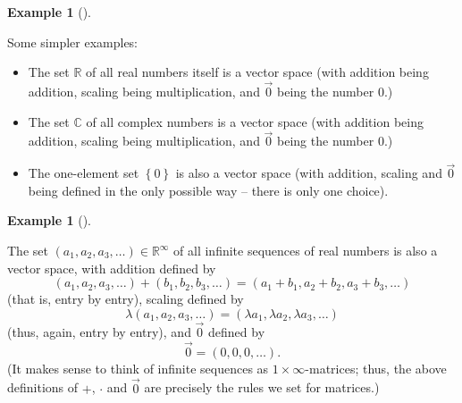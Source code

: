 \documentclass[numbers=enddot,12pt,final,onecolumn,notitlepage]{scrartcl}%
\theoremstyle{definition}
\newtheorem{exam}[theo]{Example}
\newenvironment{example}[1][]
{\begin{exam}[#1]\begin{leftbar}}
{\end{leftbar}\end{exam}}
\begin{document}
\begin{example}
\label{exam.vectspace.RC0}Some simpler examples:

\begin{itemize}
\item The set $\mathbb{R}$ of all real numbers itself is a vector space (with
addition being addition, scaling being multiplication, and $\overrightarrow{0}%
$ being the number $0$.)

\item The set $\mathbb{C}$ of all complex numbers is a vector space (with
addition being addition, scaling being multiplication, and $\overrightarrow{0}%
$ being the number $0$.)

\item The one-element set $\left\{  0\right\}  $ is also a vector space (with
addition, scaling and $\overrightarrow{0}$ being defined in the only possible
way -- there is only one choice).
\end{itemize}
\end{example}

\begin{example}
\label{exam.vectspace.Rinf}The set $\left(  a_{1},a_{2},a_{3},\ldots\right)
\in\mathbb{R}^{\infty}$ of all infinite sequences of real numbers is also a
vector space, with addition defined by%
\[
\left(  a_{1},a_{2},a_{3},\ldots\right)  +\left(  b_{1},b_{2},b_{3}%
,\ldots\right)  =\left(  a_{1}+b_{1},a_{2}+b_{2},a_{3}+b_{3},\ldots\right)
\]
(that is, entry by entry), scaling defined by%
\[
\lambda\left(  a_{1},a_{2},a_{3},\ldots\right)  =\left(  \lambda a_{1},\lambda
a_{2},\lambda a_{3},\ldots\right)
\]
(thus, again, entry by entry), and $\overrightarrow{0}$ defined by%
\[
\overrightarrow{0}=\left(  0,0,0,\ldots\right)  .
\]
(It makes sense to think of infinite sequences as $1\times\infty$-matrices;
thus, the above definitions of $+$, $\cdot$ and $\overrightarrow{0}$ are
precisely the rules we set for matrices.)
\end{example}
\end{document}
